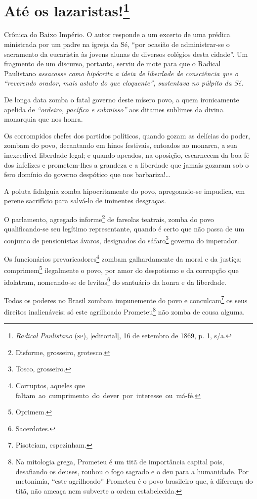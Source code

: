\chapter{Até os lazaristas!\footnote{\emph{Radical Paulistano} (\textsc{sp}),
  {[}editorial{]}, 16 de setembro de 1869, p. 1, s/a.}}

\begin{didascalia}
Crônica do Baixo Império. O autor responde a um excerto de uma prédica
ministrada por um padre na igreja da Sé, ``por ocasião de administrar-se
o sacramento da eucaristia às jovens alunas de diversos colégios desta
cidade''. Um fragmento de um discurso, portanto, serviu de mote para que
o Radical Paulistano \emph{assacasse como hipócrita a ideia de liberdade
de consciência que o ``reverendo orador, mais astuto do que eloquente'',
sustentava no púlpito da Sé.}
\end{didascalia}



De longa data zomba o fatal governo deste mísero povo, a quem
ironicamente apelida de \emph{``ordeiro, pacífico e submisso''} aos
ditames sublimes da divina monarquia que nos honra.

Os corrompidos chefes dos partidos políticos, quando gozam as delícias
do poder, zombam do povo, decantando em hinos festivais, entoados ao
monarca, a sua inexcedível liberdade legal; e quando apeados, na
oposição, escarnecem da boa fé dos infelizes e prometem-lhes a grandeza
e a liberdade que jamais gozaram sob o fero domínio do governo despótico
que nos barbariza!\ldots{}

A poluta fidalguia zomba hipocritamente do povo, apregoando-se impudica,
em perene sacrifício para salvá-lo de iminentes desgraças.

O parlamento, agregado informe\footnote{Disforme, grosseiro, grotesco.}
de farsolas teatrais, zomba do povo qualificando-se seu legítimo
representante, quando é certo que não passa de um conjunto de
pensionistas ávaros, designados do sáfaro\footnote{Tosco, grosseiro.}
governo do imperador.

Os funcionários prevaricadores\footnote{Corruptos, aqueles que
  faltam~ao~cumprimento~do~dever~por~interesse~ou~má-fé.} zombam
galhardamente da moral e da justiça; comprimem\footnote{Oprimem.}
ilegalmente o povo, por amor do despotismo e da corrupção que idolatram,
nomeando-se de levitas\footnote{Sacerdotes.} do santuário da honra e
da liberdade.

Todos os poderes no Brasil zombam impunemente do povo e
conculcam\footnote{Pisoteiam, espezinham.} os seus direitos
inalienáveis; só este agrilhoado Prometeu\footnote{Na mitologia grega,
  Prometeu é um titã de importância capital pois, desafiando os deuses,
  roubou o fogo sagrado e o deu para a humanidade. Por metonímia, ``este
  agrilhoado'' Prometeu é o povo brasileiro que, à diferença do titã, não
  ameaça nem subverte a ordem estabelecida.} não zomba de cousa alguma.

